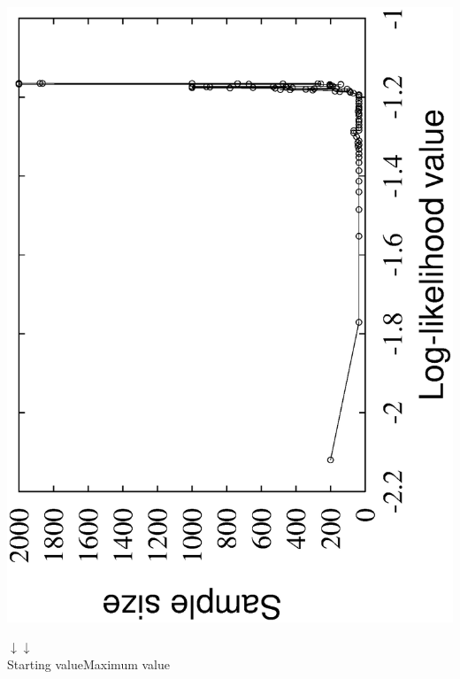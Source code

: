 \documentclass[french]{beamer}
\begin{document}
\begin{frame}
\begin{center}
\begin{minipage}{0.49\linewidth}
\end{minipage}
\begin{minipage}{0.49\linewidth}
\includegraphics[angle=270, width=\linewidth]{2000_sample_fct.ps}
\end{minipage}
\end{center}
\begin{tiny}
{\red
\hspace*{6.8cm}$\downarrow$\hspace*{3cm}$\downarrow$\\
\hspace*{6.0cm}Starting value\hspace*{1.2cm}Maximum value\\
}
\end{tiny}

\end{frame}
\end{document}
